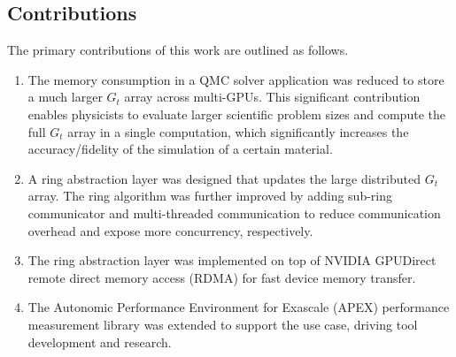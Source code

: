 \subsection{Contributions}
The primary contributions of this work are outlined as follows.
\begin{enumerate}
    \item The memory consumption in a QMC solver application was reduced to store a much larger $G_t$ array across multi-GPUs. This significant contribution 
    enables physicists to evaluate larger scientific problem sizes and 
    compute the full $G_t$ array in a single computation, 
    which significantly increases the accuracy/fidelity of the simulation of a certain material.
    \item A ring abstraction layer was designed that updates the
    large distributed $G_t$ array. The ring algorithm was further improved 
    by adding sub-ring communicator and multi-threaded communication to 
    reduce communication overhead and expose more concurrency, respectively.
    \item The ring abstraction layer was implemented on top of NVIDIA 
    GPUDirect remote direct memory
access (RDMA) for fast device memory transfer.
    \item The Autonomic Performance Environment for Exascale (APEX) performance measurement library was extended to support the use case, driving tool development and research.
\end{enumerate}

